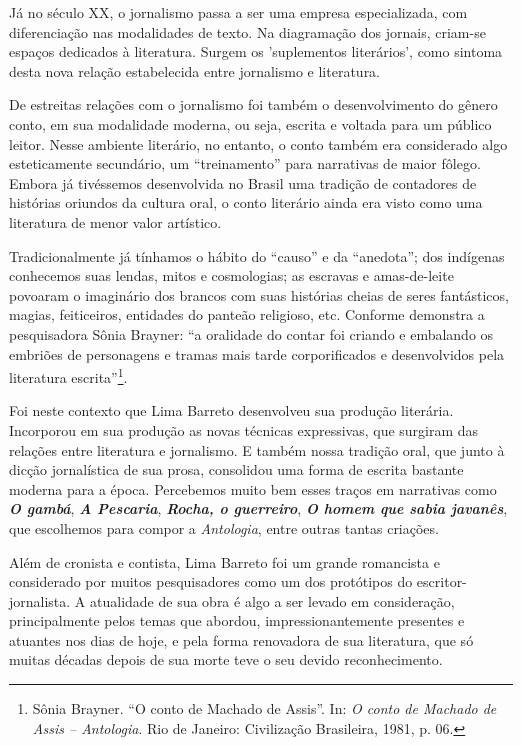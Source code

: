 Já no século XX, o jornalismo passa a ser uma empresa especializada, com
diferenciação nas modalidades de texto. Na diagramação dos jornais,
criam-se espaços dedicados à literatura. Surgem os 'suplementos
literários', como sintoma desta nova relação estabelecida entre
jornalismo e literatura.

De estreitas relações com o jornalismo foi também o desenvolvimento do
gênero conto, em sua modalidade moderna, ou seja, escrita e voltada para
um público leitor. Nesse ambiente literário, no entanto, o conto também
era considerado algo esteticamente secundário, um ``treinamento'' para
narrativas de maior fôlego. Embora já tivéssemos desenvolvida no Brasil
uma tradição de contadores de histórias oriundos da cultura oral, o
conto literário ainda era visto como uma literatura de menor valor
artístico.

Tradicionalmente já tínhamos o hábito do ``causo'' e da ``anedota''; dos
indígenas conhecemos suas lendas, mitos e cosmologias; as escravas e
amas-de-leite povoaram o imaginário dos brancos com suas histórias
cheias de seres fantásticos, magias, feiticeiros, entidades do panteão
religioso, etc. Conforme demonstra a pesquisadora Sônia Brayner: ``a
oralidade do contar foi criando e embalando os embriões de personagens e
tramas mais tarde corporificados e desenvolvidos pela literatura
escrita''\footnote{Sônia Brayner. ``O conto de Machado de Assis''. In:
  \emph{O conto de Machado de Assis -- Antologia}. Rio de Janeiro:
  Civilização Brasileira, 1981, p. 06.}.

Foi neste contexto que Lima Barreto desenvolveu sua produção literária.
Incorporou em sua produção as novas técnicas expressivas, que surgiram
das relações entre literatura e jornalismo. E também nossa tradição
oral, que junto à dicção jornalística de sua prosa, consolidou uma forma
de escrita bastante moderna para a época. Percebemos muito bem esses
traços em narrativas como \emph{\textbf{O gambá}}, \emph{\textbf{A
Pescaria}}, \emph{\textbf{Rocha, o guerreiro}}, \emph{\textbf{O homem
que sabia javanês}}, que escolhemos para compor a \emph{Antologia},
entre outras tantas criações.

Além de cronista e contista, Lima Barreto foi um grande romancista e
considerado por muitos pesquisadores como um dos protótipos do
escritor-jornalista. A atualidade de sua obra é algo a ser levado em
consideração, principalmente pelos temas que abordou,
impressionantemente presentes e atuantes nos dias de hoje, e pela forma
renovadora de sua literatura, que só muitas décadas depois de sua morte
teve o seu devido reconhecimento.

